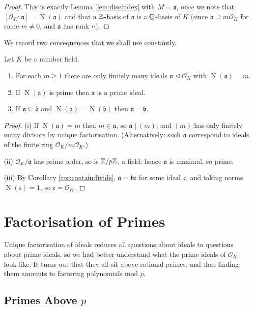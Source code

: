\documentclass[a4paper]{scrartcl}
\renewcommand{\OO}{\mathcal{O}}
\newcommand{\Nm}{\operatorname{N}}
\newcommand{\fa}{\mathfrak{a}}
\newcommand{\fb}{\mathfrak{b}}
\newcommand{\fc}{\mathfrak{c}}
\begin{document}
\begin{proof}
	This is exactly Lemma \ref{lem:discindex} with $M = \fa$, once we note that $[\OO_K:\fa] = \Nm(\fa)$ and that a $\mathbb{Z}$-basis of $\fa$ is a $\mathbb{Q}$-basis of $K$ (since $\fa \supseteq m\OO_K$ for some $m \neq 0$, and $\fa$ has rank $n$).
\end{proof}

We record two consequences that we shall use constantly.

\begin{corollary}\label{cor:normbounds}
	Let $K$ be a number field.
	\begin{enumerate}[label=(\roman*)]
		\item For each $m \geq 1$ there are only finitely many ideals $\fa \trianglelefteq \OO_K$ with $\Nm(\fa) = m$.
		\item If $\Nm(\fa)$ is prime then $\fa$ is a prime ideal.
		\item If $\fa \subseteq \fb$ and $\Nm(\fa) = \Nm(\fb)$ then $\fa = \fb$.
	\end{enumerate}
\end{corollary}

\begin{proof}
	(i) If $\Nm(\fa) = m$ then $m \in \fa$, so $\fa \mid (m)$; and $(m)$ has only finitely many divisors by unique factorisation. (Alternatively: such $\fa$ correspond to ideals of the finite ring $\OO_K/m\OO_K$.)

	(ii) $\OO_K/\fa$ has prime order, so is $\mathbb{Z}/p\mathbb{Z}$, a field; hence $\fa$ is maximal, so prime.

	(iii) By Corollary \ref{cor:containdivide}, $\fa = \fb\fc$ for some ideal $\fc$, and taking norms $\Nm(\fc) = 1$, so $\fc = \OO_K$.
\end{proof}

\section{Factorisation of Primes}\label{sec:ram}

Unique factorisation of ideals reduces all questions about ideals to questions about prime ideals, so we had better understand what the prime ideals of $\OO_K$ look like. It turns out that they all sit above rational primes, and that finding them amounts to factoring polynomials mod $p$.

\subsection{Primes Above $p$}
\end{document}
